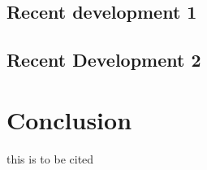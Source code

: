 \documentclass[10pt]{article}
\begin{document}
\begin{multicols}{2}
\subsection{Recent development 1}
\subsection{Recent Development 2}

\section{Conclusion}
this  is to be cited \cite{maletinsky2012robust}

\newpage
\printbibliography

\end{multicols}
\end{document}
